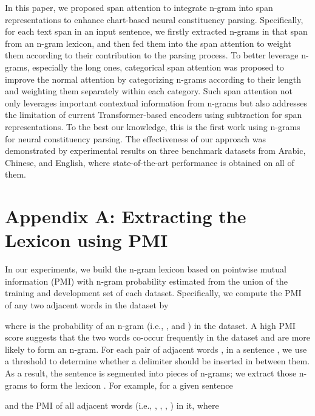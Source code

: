 \documentclass[11pt,a4paper]{article}
\begin{document}
In this paper, we proposed span attention to integrate n-gram into span representations to enhance chart-based neural constituency parsing.
Specifically, for each text span in an input sentence, we firstly extracted n-grams in that span from an n-gram lexicon, and then fed them into the span attention to weight them according to their contribution to the parsing process.
To better leverage n-grams, especially the long ones, categorical span attention was proposed to improve the normal attention by categorizing n-grams according to their length and weighting them separately within each category.
Such span attention not only leverages important contextual information from n-grams but also addresses the limitation of current Transformer-based encoders using subtraction for span representations.
To the best our knowledge, this is the first work using n-grams for neural constituency parsing.
The effectiveness of our approach was demonstrated by experimental results on three benchmark datasets from 
Arabic, Chinese, and English, where 
state-of-the-art performance is obtained on all of them.







\appendix



\vspace{1cm}

\section*{Appendix A: Extracting the Lexicon using PMI} \label{app: pmi}

In our experiments, we build the n-gram lexicon  based on pointwise mutual information (PMI)
with n-gram probability estimated from the union of the training and development set of each dataset.
Specifically, we compute the PMI of any two adjacent words  in the dataset by

where  is the probability of an n-gram (i.e., ,  and ) in the dataset.
A high PMI score suggests that the two words co-occur frequently in the dataset and are more likely to form an n-gram.
For each pair of adjacent words ,  in a sentence , we use a threshold to determine whether a delimiter should be inserted in between them.
As a result, the sentence  is segmented into pieces of n-grams; we extract those n-grams to form the lexicon .
For example, for a given sentence

and the PMI of all adjacent words (i.e., , , , ) in it, where
\end{document}
